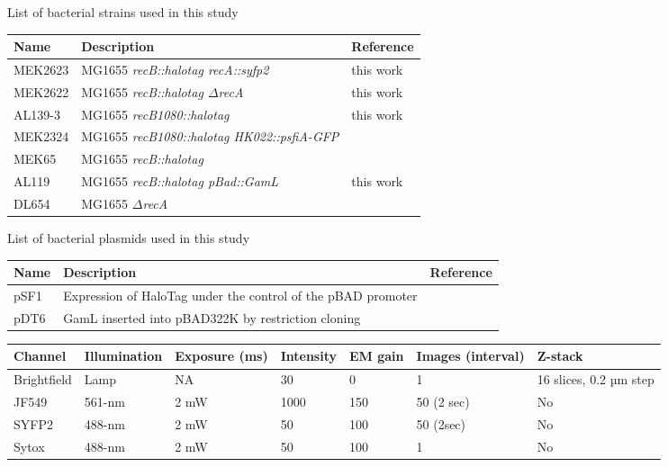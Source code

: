 \begin{supptable}[htbp]
    \centering
    \caption{List of bacterial strains used in this study}
    \begin{tabular}{lll}
        \toprule
        Name & Description & Reference\\
        \midrule
        MEK2623 & MG1655 \textit{recB::halotag recA::syfp2} & this work\\
        MEK2622 & MG1655 \textit{recB::halotag $\Delta$recA} & this work \\ %
        AL139-3 & MG1655 \textit{recB1080::halotag} & this work \\ %
        MEK2324 & MG1655 \textit{recB1080::halotag HK022::psfiA-GFP} &  \\ %
        MEK65 & MG1655 \textit{recB::halotag} & \cite{Lepore2019a} \\
        AL119 & MG1655 \textit{recB::halotag pBad::GamL} & this work \\ %
        DL654 & MG1655 \textit{$\Delta$recA} & \cite{Wertman1986} \\
        \bottomrule
    \end{tabular}
    \label{SItab:strains}
\end{supptable}

\begin{supptable}[htbp]
    \centering
    \caption{List of bacterial plasmids used in this study}
    \begin{tabular}{lll}
        \toprule
        Name & Description & Reference\\
        \midrule
        pSF1 & Expression of HaloTag under the control of the pBAD promoter & \cite{Lepore2019a} \\
        pDT6 & GamL inserted into pBAD322K by restriction cloning & \cite{Wilkinson2016} \\
        \bottomrule
    \end{tabular}
    \label{SItab:plasmids}
\end{supptable}

\begin{supptable}[htbp]
    \centering
    \caption{}
    \begin{tabular}{lllllll}
        \toprule
        Channel & Illumination & Exposure (ms) & Intensity & EM gain & Images (interval) & Z-stack\\
        \midrule
        Brightfield & Lamp & NA & 30 & 0 & 1 & 16 slices, 0.2 µm step\\
        JF549 & 561-nm & 2 mW & 1000 & 150 & 50 (2 sec) & No\\
        SYFP2 & 488-nm & 2 mW & 50 & 100 & 50 (2sec) & No\\
        Sytox & 488-nm & 2 mW & 50 & 100 & 1 & No\\
        \bottomrule
    \end{tabular}
    \label{SItab:acquisition_channels}
\end{supptable}

